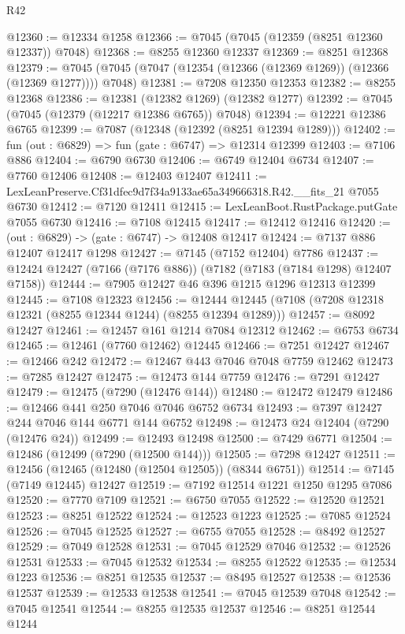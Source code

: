 \begin{lexlean}{R42}
\begin{coremodule}
{@12360 := @12334 @1258
@12366 := @7045 (@7045 (@12359 (@8251 @12360 @12337)) @7048)
@12368 := @8255 @12360 @12337
@12369 := @8251 @12368
@12379 := @7045 (@7045 (@7047 (@12354 (@12366 (@12369 @1269)) (@12366 (@12369 @1277)))) @7048)
@12381 := @7208 @12350 @12353
@12382 := @8255 @12368
@12386 := @12381 (@12382 @1269) (@12382 @1277)
@12392 := @7045 (@7045 (@12379 (@12217 @12386 @6765)) @7048)
@12394 := @12221 @12386 @6765
@12399 := @7087 (@12348 (@12392 (@8251 @12394 @1289)))
@12402 := fun (out : @6829) => fun (gate : @6747) => @12314 @12399
@12403 := @7106 @886
@12404 := @6790 @6730
@12406 := @6749 @12404 @6734
@12407 := @7760 @12406
@12408 := @12403 @12407
@12411 := LexLeanPreserve.Cf31dfec9d7f34a9133ae65a349666318.R42.__fits_21 @7055 @6730
@12412 := @7120 @12411
@12415 := LexLeanBoot.RustPackage.putGate @7055 @6730
@12416 := @7108 @12415
@12417 := @12412 @12416
@12420 := (out : @6829) -> (gate : @6747) -> @12408 @12417
@12424 := @7137 @886 @12407 @12417 @1298
@12427 := @7145 (@7152 @12404) @7786
@12437 := @12424 @12427 (@7166 (@7176 @886)) (@7182 (@7183 (@7184 @1298) @12407 @7158))
@12444 := @7905 @12427 @46 @396 @1215 @1296 @12313 @12399
@12445 := @7108 @12323
@12456 := @12444 @12445 (@7108 (@7208 @12318 @12321 (@8255 @12344 @1244) (@8255 @12394 @1289)))
@12457 := @8092 @12427
@12461 := @12457 @161 @1214 @7084 @12312
@12462 := @6753 @6734
@12465 := @12461 (@7760 @12462) @12445
@12466 := @7251 @12427
@12467 := @12466 @242
@12472 := @12467 @443 @7046 @7048 @7759 @12462
@12473 := @7285 @12427
@12475 := @12473 @144 @7759
@12476 := @7291 @12427
@12479 := @12475 (@7290 (@12476 @144))
@12480 := @12472 @12479
@12486 := @12466 @441 @250 @7046 @7046 @6752 @6734
@12493 := @7397 @12427 @244 @7046 @144 @6771 @144 @6752
@12498 := @12473 @24 @12404 (@7290 (@12476 @24))
@12499 := @12493 @12498
@12500 := @7429 @6771
@12504 := @12486 (@12499 (@7290 (@12500 @144)))
@12505 := @7298 @12427
@12511 := @12456 (@12465 (@12480 (@12504 @12505)) (@8344 @6751))
@12514 := @7145 (@7149 @12445) @12427
@12519 := @7192 @12514 @1221 @1250 @1295 @7086
@12520 := @7770 @7109
@12521 := @6750 @7055
@12522 := @12520 @12521
@12523 := @8251 @12522
@12524 := @12523 @1223
@12525 := @7085 @12524
@12526 := @7045 @12525
@12527 := @6755 @7055
@12528 := @8492 @12527
@12529 := @7049 @12528
@12531 := @7045 @12529 @7046
@12532 := @12526 @12531
@12533 := @7045 @12532
@12534 := @8255 @12522
@12535 := @12534 @1223
@12536 := @8251 @12535
@12537 := @8495 @12527
@12538 := @12536 @12537
@12539 := @12533 @12538
@12541 := @7045 @12539 @7048
@12542 := @7045 @12541
@12544 := @8255 @12535 @12537
@12546 := @8251 @12544 @1244
}
\end{coremodule}
\end{lexlean}
